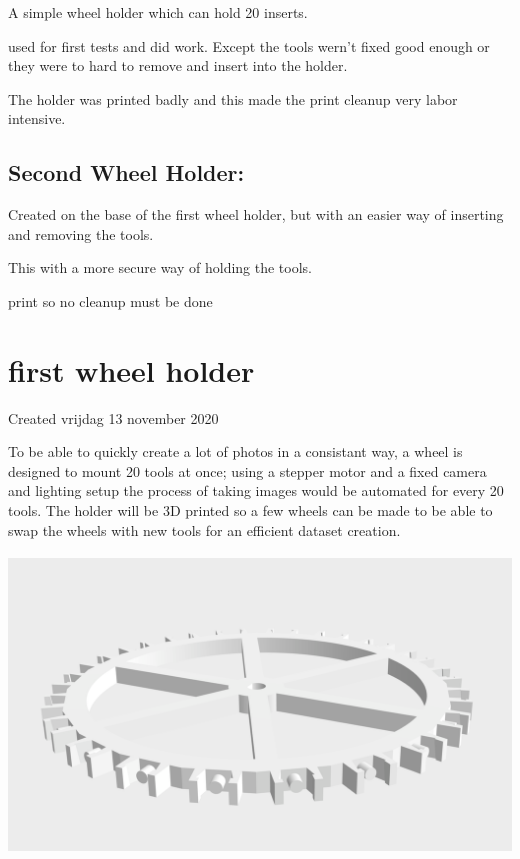 \documentclass{article}
\begin{document}
A simple wheel holder which can hold 20 inserts.

used for first tests and did work. Except the tools wern't fixed good enough or they were to hard to remove and insert into the holder.

The holder was printed badly and this made the print cleanup very labor intensive. 



\subsection{Second Wheel Holder:}

Created on the base of the first wheel holder, but with an easier way of inserting and removing the tools. 

This with a more secure way of holding the tools. 

print so no cleanup must be done








		\section{first wheel holder}

Created vrijdag 13 november 2020



To be able to quickly create a lot of photos in a consistant way, a wheel is designed to mount 20 tools at once; using a stepper motor and a fixed camera and lighting setup the process of taking images would be automated for every 20 tools. The holder will be 3D printed so a few wheels can be made to be able to swap the wheels with new tools for an efficient dataset creation.



\includegraphics[height=3.125000in, keepaspectratio=true]{./ZimFiles_files/Camera_setup/Tool_Holder/Wheel_Holder/first_wheel_holder/radhouder.png}
\end{document}
